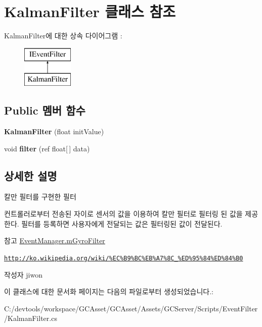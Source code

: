 \hypertarget{class_kalman_filter}{}\section{Kalman\+Filter 클래스 참조}
\label{class_kalman_filter}
Kalman\+Filter에 대한 상속 다이어그램 \+: \begin{figure}[H]
\begin{center}
\leavevmode
\includegraphics[height=2.000000cm]{class_kalman_filter}
\end{center}
\end{figure}
\subsection*{Public 멤버 함수}
\begin{DoxyCompactItemize}
\item 
\hypertarget{class_kalman_filter_acd6545f9bd224b877adf564460f8bc73}{}{\bfseries Kalman\+Filter} (float init\+Value)\label{class_kalman_filter_acd6545f9bd224b877adf564460f8bc73}

\item 
\hypertarget{class_kalman_filter_a9a7d63d4acea7ce12b83b00f9d02f7cb}{}void {\bfseries filter} (ref float\mbox{[}$\,$\mbox{]} data)\label{class_kalman_filter_a9a7d63d4acea7ce12b83b00f9d02f7cb}

\end{DoxyCompactItemize}


\subsection{상세한 설명}
칼만 필터를 구현한 필터

컨트롤러로부터 전송된 자이로 센서의 값을 이용하여 칼만 필터로 필터링 된 값을 제공한다. 필터를 등록하면 사용자에게 전달되는 값은 필터링된 값이 전달된다. \begin{DoxySeeAlso}{참고}
\hyperlink{class_event_manager_a7cee85488f5d7220c102cd945b1f494a}{Event\+Manager.\+m\+Gyro\+Filter} 

\href{http://ko.wikipedia.org/wiki/%EC%B9%BC%EB%A7%8C_%ED%95%84%ED%84%B0}{\tt http\+://ko.\+wikipedia.\+org/wiki/\%\+E\+C\%\+B9\%\+B\+C\%\+E\+B\%\+A7\%8\+C\+\_\+\%\+E\+D\%95\%84\%\+E\+D\%84\%\+B0} 
\end{DoxySeeAlso}
\begin{DoxyAuthor}{작성자}
jiwon 
\end{DoxyAuthor}


이 클래스에 대한 문서화 페이지는 다음의 파일로부터 생성되었습니다.\+:\begin{DoxyCompactItemize}
\item 
C\+:/devtools/workspace/\+G\+C\+Asset/\+G\+C\+Asset/\+Assets/\+G\+C\+Server/\+Scripts/\+Event\+Filter/Kalman\+Filter.\+cs\end{DoxyCompactItemize}

